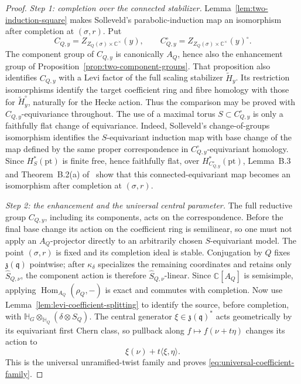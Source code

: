 \documentclass[10pt,a4paper]{amsart}
\newcommand{\Hh}{\mathbb H}
\begin{document}
\begin{proof}
\smallskip
\noindent\emph{Step 1: completion over the connected stabilizer.}
Lemma~\ref{lem:two-induction-square} makes Solleveld's parabolic-induction map
an isomorphism after completion at $(\sigma,r)$.  Put
\[
 C_{Q,y}=Z_{Z_Q(\sigma)\times\mathbb C^\times}(y),\qquad
 C_{Q,y}^{\circ}=Z_{Z_Q(\sigma)\times\mathbb C^\times}(y)^{\circ}.
\]
The component group of $C_{Q,y}$ is canonically $A_Q$, hence also the enhancement group
of Proposition~\ref{prop:two-component-groups}.  That proposition also
identifies $C_{Q,y}$ with a Levi factor of the full scaling stabilizer
$\widetilde H_y$.  Its restriction isomorphisms identify the target
coefficient ring and fibre homology with those for
$\widetilde H_y^\circ$, naturally for the Hecke action.  Thus the
comparison may be proved with $C_{Q,y}$-equivariance throughout.
The use of a maximal torus
$S\subset C_{Q,y}^{\circ}$ is only a faithfully flat change of equivariance.
Indeed, Solleveld's change-of-groups isomorphism
\cite[equation~(B.1)]{Solleveld}
identifies the $S$-equivariant induction map with base change of the map
defined by the same proper correspondence in
$C_{Q,y}^{\circ}$-equivariant homology.  Since
$H_S^*(\mathrm{pt})$ is finite free, hence faithfully flat, over
$H_{C_{Q,y}^{\circ}}^*(\mathrm{pt})$, Lemma~B.3 and
Theorem~B.2(a) of~\cite{Solleveld} show that this connected-equivariant map
becomes an isomorphism after completion at $(\sigma,r)$.

\smallskip
\noindent\emph{Step 2: the enhancement and the universal central parameter.}
The full reductive group $C_{Q,y}$, including its components, acts on the
correspondence.  Before the final base
change its action on the coefficient ring is semilinear, so one must not
apply an $A_Q$-projector directly to an arbitrarily chosen
$S$-equivariant model.  The point $(\sigma,r)$ is fixed and its completion
ideal is stable.  Conjugation by $Q$ fixes $\mathfrak z(\mathfrak q)$
pointwise; after $\kappa_\delta$ specializes the remaining coordinates and
retains only $\widehat S_{Q,\nu}$, the component action is therefore
$\widehat S_{Q,\nu}$-linear.  Since $\mathbb C[A_Q]$ is semisimple, applying
$\operatorname{Hom}_{A_Q}(\rho_Q,-)$ is exact and commutes with completion.
Now use Lemma~\ref{lem:levi-coefficient-splitting} to identify the source,
before completion, with
$\Hh_G\otimes_{\Hh_Q}(\delta\otimes S_Q)$.  The central generator
$\xi\in\mathfrak z(\mathfrak q)^*$ acts geometrically by its equivariant
first Chern class, so pullback along $f\mapsto f(\nu+t\eta)$ changes its action
to
\[
 \xi(\nu)+t\langle\xi,\eta\rangle.
\]
This is the universal unramified-twist family and proves
\eqref{eq:universal-coefficient-family}.


\end{proof}
\end{document}
